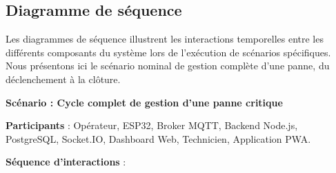 
\subsection{Diagramme de séquence}

Les diagrammes de séquence illustrent les interactions temporelles entre les différents composants du système lors de l'exécution de scénarios spécifiques. Nous présentons ici le scénario nominal de gestion complète d'une panne, du déclenchement à la clôture.

\textbf{Scénario : Cycle complet de gestion d'une panne critique}

\textbf{Participants} : Opérateur, ESP32, Broker MQTT, Backend Node.js, PostgreSQL, Socket.IO, Dashboard Web, Technicien, Application PWA.

\textbf{Séquence d'interactions} :

